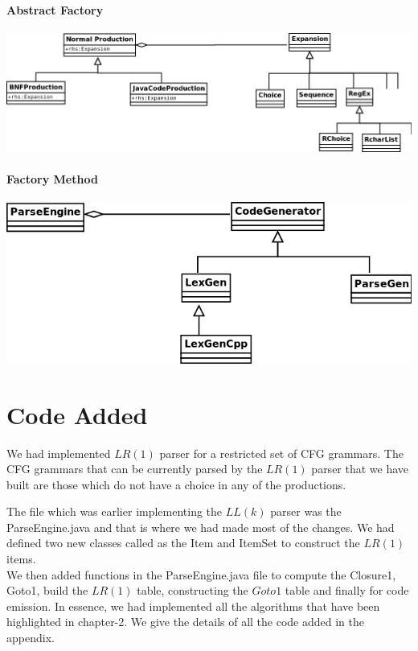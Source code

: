 \documentclass[•]{book}
\begin{document}
\subsubsection*{Abstract Factory} 

\begin{center}
\includegraphics[scale=0.4]{AbstractFactory1.png}
\end{center} 

\subsubsection*{Factory Method}
\begin{center}
\includegraphics[scale=0.5]{FactoryMethod1.png}
\end{center}

\chapter{Code Added}
We had implemented $LR(1)$ parser for a restricted set of CFG grammars. The CFG grammars that can be currently parsed by the $LR(1)$ parser that we have built are those which do not have a choice in any of the productions.

The file which was earlier implementing the $LL(k)$ parser was the ParseEngine.java and that is where we had made most of the changes. We had defined two new classes called as the Item and ItemSet to construct the $LR(1)$ items.\\


We then added functions in the ParseEngine.java file to compute the Closure1, Goto1, build the $LR(1)$ table, constructing the $Goto1$ table and finally for code emission. In essence, we had implemented all the algorithms that have been highlighted in chapter-2. We give the details of all the code added in the appendix.
\end{document}
